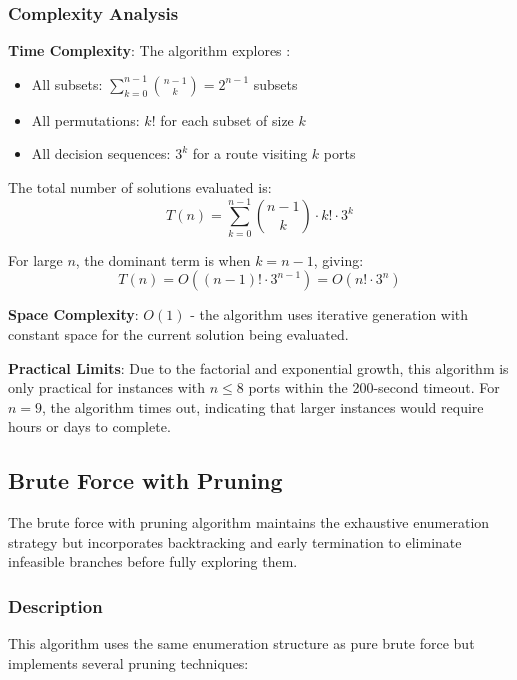 \documentclass[12pt]{article}
\begin{document}
\subsubsection{Complexity Analysis}

\textbf{Time Complexity}: The algorithm explores \cite{cormen2009}:
\begin{itemize}
    \item All subsets: $\sum_{k=0}^{n-1} \binom{n-1}{k} = 2^{n-1}$ subsets
    \item All permutations: $k!$ for each subset of size $k$ \cite{knuth2011}
    \item All decision sequences: $3^k$ for a route visiting $k$ ports
\end{itemize}

The total number of solutions evaluated is:
\[
T(n) = \sum_{k=0}^{n-1} \binom{n-1}{k} \cdot k! \cdot 3^k
\]

For large $n$, the dominant term is when $k = n-1$, giving:
\[
T(n) = O((n-1)! \cdot 3^{n-1}) = O(n! \cdot 3^n)
\]

\textbf{Space Complexity}: $O(1)$ - the algorithm uses iterative generation with constant space for the current solution being evaluated.

\textbf{Practical Limits}: Due to the factorial and exponential growth, this algorithm is only practical for instances with $n \leq 8$ ports within the 200-second timeout. For $n=9$, the algorithm times out, indicating that larger instances would require hours or days to complete.

\subsection{Brute Force with Pruning}
\label{subsec:pruned_bf}

The brute force with pruning algorithm maintains the exhaustive enumeration strategy but incorporates backtracking and early termination to eliminate infeasible branches before fully exploring them.

\subsubsection{Description}

This algorithm uses the same enumeration structure as pure brute force but implements several pruning techniques:
\end{document}
